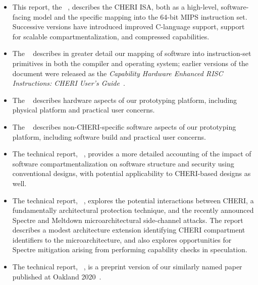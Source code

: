 \begin{itemize}
\item This report, the ~\cite{UCAM-CL-TR-850, UCAM-CL-TR-864,
  UCAM-CL-TR-876, UCAM-CL-TR-891, UCAM-CL-TR-907, UCAM-CL-TR-927,
  UCAM-CL-TR-951},
  describes the CHERI ISA, both as a high-level, software-facing
  model and the specific mapping into the 64-bit MIPS instruction set.
  Successive versions have introduced improved C-language support, support for
  scalable compartmentalization, and compressed capabilities.

\item The ~\cite{UCAM-CL-TR-877} describes in greater detail our
  mapping of software into instruction-set primitives in both the compiler and
  operating system; earlier versions of the document were released as the
  \textit{Capability Hardware Enhanced RISC Instructions: CHERI User's
  Guide}~\cite{UCAM-CL-TR-851}.

\item The ~\cite{UCAM-CL-TR-852, UCAM-CL-TR-868} describes hardware aspects
  of our prototyping platform, including physical platform and practical user
  concerns.

\item The ~\cite{UCAM-CL-TR-853, UCAM-CL-TR-869} describes
  non-CHERI-specific software aspects of our prototyping platform, including
  software build and practical user concerns.

\item The technical report, ~\cite{UCAM-CL-TR-873}, provides a more
  detailed accounting of the impact of software compartmentalization on
  software structure and security using conventional designs, with potential
  applicability to CHERI-based designs as well.

\item The technical report, ~\cite{UCAM-CL-TR-916},
  explores the potential interactions between
  CHERI, a fundamentally architectural protection technique, and the recently
  announced Spectre and Meltdown microarchitectural side-channel attacks.
  The report describes a modest architecture extension identifying CHERI
  compartment identifiers to the microarchitecture, and also explores
  opportunities for Spectre mitigation arising from performing capability
  checks in speculation.

\item The technical report, ~\cite{UCAM-CL-TR-940},
  is a preprint version of our similarly named
  paper published at Oakland 2020~\cite{cheri-formal-SP2020}.


\end{itemize}
